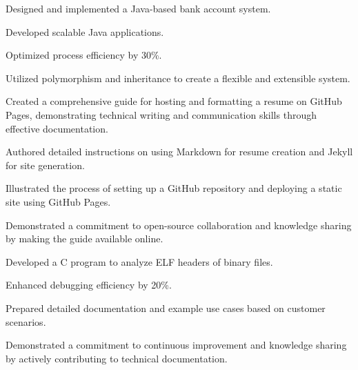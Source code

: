 \begin{minipage}[t]{0.63\textwidth}
    \vspace{5pt}
    \begin{tightemize}
      \item Designed and implemented a Java-based bank account system.
      \item Developed scalable Java applications.
      \item Optimized process efficiency by 30\%.
      \item Utilized polymorphism and inheritance to create a flexible and extensible system.
    \end{tightemize}
  \sectionsep

    \vspace{5pt}
    \begin{tightemize}
      \item Created a comprehensive guide for hosting and formatting a resume on GitHub Pages, demonstrating technical writing and communication skills through effective documentation.
      \item Authored detailed instructions on using Markdown for resume creation and Jekyll for site generation.
      \item Illustrated the process of setting up a GitHub repository and deploying a static site using GitHub Pages.
      \item Demonstrated a commitment to open-source collaboration and knowledge sharing by making the guide available online.
    \end{tightemize}
  \sectionsep

    \vspace{5pt}
    \begin{tightemize}
      \item Developed a C program to analyze ELF headers of binary files.
      \item Enhanced debugging efficiency by 20\%.
      \item Prepared detailed documentation and example use cases based on customer scenarios.
      \item Demonstrated a commitment to continuous improvement and knowledge sharing by actively contributing to technical documentation.
    \end{tightemize}
  \sectionsep


\end{minipage}

